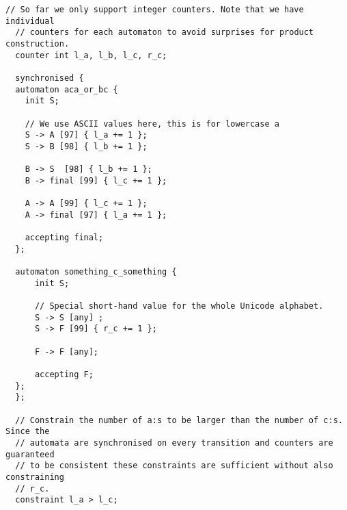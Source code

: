 \documentclass[acmsmall,review,anonymous,screen]{acmart}\settopmatter{printfolios=true,printccs=false,printacmref=true}
\theoremstyle{definition}
\begin{document}
\begin{lstlisting}[caption={An example input file for \Catra{} for the problem introduced in \cref{sec:motivation}, illustrating every major syntax element. From beginning to end: synchronised (product) automata using the keyword \texttt{synchronised} (automata A and B), labels (except those with ranges), register increments, and constraints on the final values of their counters.}, label=lst:input-example]
  // So far we only support integer counters. Note that we have individual
  // counters for each automaton to avoid surprises for product construction.
  counter int l_a, l_b, l_c, r_c;

  synchronised {
  automaton aca_or_bc {
    init S;
  
    // We use ASCII values here, this is for lowercase a
    S -> A [97] { l_a += 1 };
    S -> B [98] { l_b += 1 };
  
    B -> S  [98] { l_b += 1 };
    B -> final [99] { l_c += 1 };
  
    A -> A [99] { l_c += 1 };
    A -> final [97] { l_a += 1 };
  
    accepting final;
  };
  
  automaton something_c_something {
      init S;
  
      // Special short-hand value for the whole Unicode alphabet.
      S -> S [any] ;
      S -> F [99] { r_c += 1 };
  
      F -> F [any];
  
      accepting F;
  };
  };
  
  // Constrain the number of a:s to be larger than the number of c:s. Since the
  // automata are synchronised on every transition and counters are guaranteed
  // to be consistent these constraints are sufficient without also constraining
  // r_c.
  constraint l_a > l_c;
\end{lstlisting}

\end{document}
